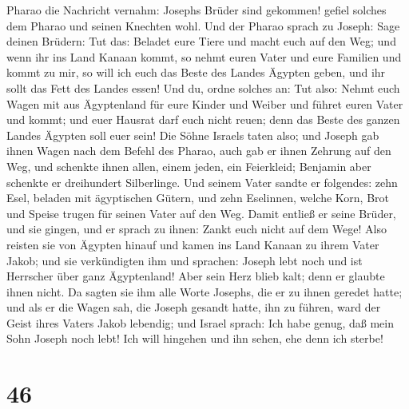 Pharao die Nachricht vernahm: Josephs Brüder sind gekommen! gefiel
solches dem Pharao und seinen Knechten wohl.  Und der
Pharao sprach zu Joseph: Sage deinen Brüdern: Tut das: Beladet eure
Tiere und macht euch auf den Weg;  und wenn ihr ins Land
Kanaan kommt, so nehmt euren Vater und eure Familien und kommt zu mir,
so will ich euch das Beste des Landes Ägypten geben, und ihr sollt das
Fett des Landes essen!  Und du, ordne solches an: Tut
also: Nehmt euch Wagen mit aus Ägyptenland für eure Kinder und Weiber
und führet euren Vater und kommt;  und euer Hausrat darf
euch nicht reuen; denn das Beste des ganzen Landes Ägypten soll euer
sein!  Die Söhne Israels taten also; und Joseph gab ihnen
Wagen nach dem Befehl des Pharao, auch gab er ihnen Zehrung auf den Weg,
 und schenkte ihnen allen, einem jeden, ein Feierkleid;
Benjamin aber schenkte er dreihundert Silberlinge.  Und
seinem Vater sandte er folgendes: zehn Esel, beladen mit ägyptischen
Gütern, und zehn Eselinnen, welche Korn, Brot und Speise trugen für
seinen Vater auf den Weg.  Damit entließ er seine Brüder,
und sie gingen, und er sprach zu ihnen: Zankt euch nicht auf dem Wege!
 Also reisten sie von Ägypten hinauf und kamen ins Land
Kanaan zu ihrem Vater Jakob;  und sie verkündigten ihm
und sprachen: Joseph lebt noch und ist Herrscher über ganz Ägyptenland!
Aber sein Herz blieb kalt; denn er glaubte ihnen nicht. 
Da sagten sie ihm alle Worte Josephs, die er zu ihnen geredet hatte; und
als er die Wagen sah, die Joseph gesandt hatte, ihn zu führen, ward der
Geist ihres Vaters Jakob lebendig;  und Israel sprach:
Ich habe genug, daß mein Sohn Joseph noch lebt! Ich will hingehen und
ihn sehen, ehe denn ich sterbe!

\hypertarget{section-45}{%
\section{46}\label{section-45}}


